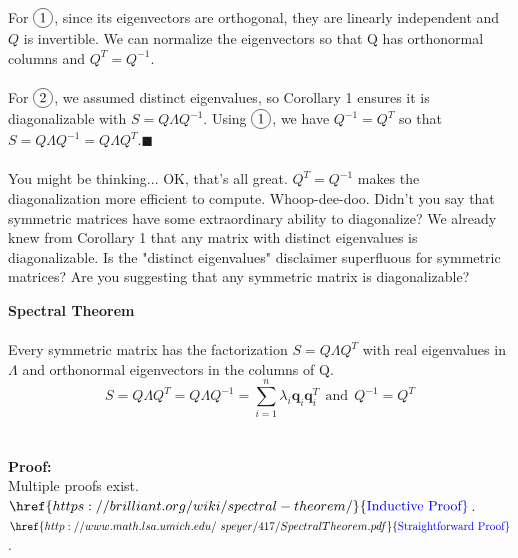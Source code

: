 \documentclass{tufte-handout}
\newcommand*\circled[1]{\tikz[baseline=(char.base)]{
		\node[shape=circle,draw,inner sep=2pt] (char) {#1};}}
\renewcommand{\qedsymbol}{$\blacksquare$}
\newcommand{\Waynehref}[3][blue]{\href{#2}{\color{#1}{#3}}}%
\begin{document}
\noindent For $\circled{1}$, since its eigenvectors are orthogonal, they are linearly independent and $Q$ is invertible. We can normalize the eigenvectors so that Q has orthonormal columns and $Q^T=Q^{-1}$.\\\leavevmode\\

\noindent For $\circled{2}$, we assumed distinct eigenvalues, so Corollary 1 ensures it is diagonalizable with $S=Q\Lambda Q^{-1}$. Using $\circled{1}$, we have $Q^{-1}=Q^T$ so that $S=Q\Lambda Q^{-1}=Q\Lambda Q^T$.\quad\qedsymbol\\\leavevmode\\

\noindent You might be thinking... OK, that's all great. $Q^T=Q^{-1}$ makes the diagonalization more efficient to compute. Whoop-dee-doo. Didn't you say that symmetric matrices have some extraordinary ability to diagonalize? We already knew from Corollary 1 that any matrix with distinct eigenvalues is diagonalizable. Is the "distinct eigenvalues" disclaimer superfluous for symmetric matrices? Are you suggesting that any symmetric matrix is diagonalizable?

\[\]
{\Large\textbf{Spectral Theorem}}\\\leavevmode\\
\noindent Every symmetric matrix has the factorization $S=Q\Lambda Q^{T}$ with real eigenvalues in $\Lambda$ and orthonormal eigenvectors in the columns of Q.
\[
S=Q\Lambda Q^{T}=Q\Lambda Q^{-1}=\sum_{i=1}^{n}\lambda_i\mathbf{q}_i\mathbf{q}_i^T~~\text{and}~~Q^{-1}=Q^T
\]\\\leavevmode\\
\noindent\textbf{Proof:}\\
\noindent Multiple proofs exist. $\Waynehref{https://brilliant.org/wiki/spectral-theorem/}{\text{Inductive Proof}}$. $\Waynehref{http://www.math.lsa.umich.edu/~speyer/417/SpectralTheorem.pdf}{\text{Straightforward Proof}}$.
\end{document}
